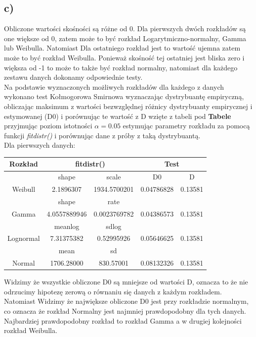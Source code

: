 \documentclass{article}
\begin{document}
\subsection{c)}
Obliczone wartości skośności są różne od 0. Dla pierwszych dwóch rozkładów są one większe od 0, zatem może to być rozkład Logarytmiczno-normalny, Gamma lub Weibulla. Natomiast Dla ostatniego rozkład jest to wartość ujemna zatem może to być rozkład Weibulla. Ponieważ skośność tej ostatniej jest bliska zero i większa od -1 to może to także być rozkład normalny, natomiast dla każdego zestawu danych dokonamy odpowiednie testy. \\
Na podstawie wyznaczonych możliwych rozkładów dla każdego z danych wykonano test Kołmogorowa Smirnowa wyznaczając dystrybuantę empiryczną, obliczając maksimum z wartości bezwzględnej różnicy dystrybuanty empirycznej i estymowanej (D0) i porównując te wartość z D wzięte z tabeli pod \textbf{Tabele} przyjmując poziom istotności $\alpha = 0.05$ estymując parametry rozkładu za pomocą funkcji \textit{fitdistr()} i porównując dane z próby z taką dystrybuantą. \\
Dla pierwszych danych:
\begin{center} \begin{tabular}{|c|c|c|c|c|} \hline
Rozkład & \multicolumn{2}{|c|}{fitdistr()} & \multicolumn{2}{|c|}{Test} \\ \hline
& shape & scale & D0 & D \\ \hline
Weibull & 2.1896307 & 1934.5700201 & 0.04786828 & 0.13581 \\ \hline
& shape & rate & & \\ \hline
Gamma & 4.0557889946 & 0.0023769782 & 0.04386573 & 0.13581 \\ \hline
& meanlog & sdlog & & \\ \hline
Lognormal & 7.31375382 & 0.52995926 & 0.05646625 & 0.13581 \\ \hline
& mean & sd & & \\ \hline
Normal & 1706.28000 & 830.57001 & 0.08132326 & 0.13581 \\ \hline
\end{tabular} \end{center}
Widzimy że wszystkie obliczone D0 są mniejsze od wartości D, oznacza to że nie odrzucimy hipotezę zerową o równaniu się danych z każdym rozkładem. Natomiast Widzimy że największe obliczone D0 jest przy rozkładzie normalnym, co oznacza że rozkład Normalny jest najmniej prawdopodobny dla tych danych. Najbardziej prawdopodobny rozkład to rozkład Gamma a w drugiej kolejności rozkład Weibulla. \\ \par
\end{document}
